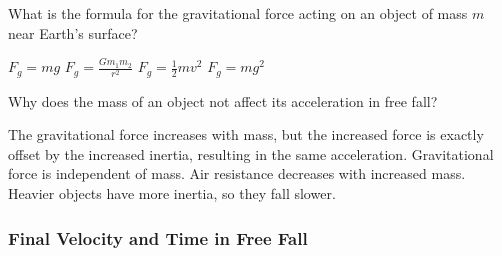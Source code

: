 \documentclass[]{exam}
\theoremstyle{definition}
\begin{document}
\begin{questions}
\question  
What is the formula for the gravitational force acting on an object of mass \( m \) near Earth’s surface?  
\begin{randomizechoices}  
    \correctchoice \( F_g = mg \)  
    \choice \( F_g = \frac{Gm_1m_2}{r^2} \)  
    \choice \( F_g = \frac{1}{2}mv^2 \)  
    \choice \( F_g = m g^2 \)  
\end{randomizechoices}  



\question  
Why does the mass of an object not affect its acceleration in free fall?  
\begin{randomizechoices}  
    \correctchoice The gravitational force increases with mass, but the increased force is exactly offset by the increased inertia, resulting in the same acceleration.  
    \choice Gravitational force is independent of mass.  
    \choice Air resistance decreases with increased mass.  
    \choice Heavier objects have more inertia, so they fall slower.  
\end{randomizechoices}  

\end{questions}

\subsubsection*{Final Velocity and Time in Free Fall}
\end{document}
